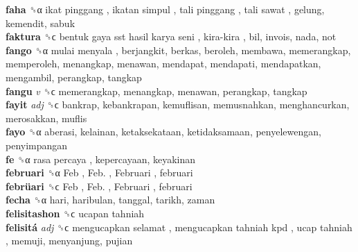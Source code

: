 \textbf{faha} ␝α   ikat pinggang ,  ikatan simpul ,  tali pinggang ,  tali sawat , gelung, kemendit, sabuk  \\
\textbf{faktura} ␝ϲ   bentuk gaya sst hasil karya seni ,  kira-kira , bil, invois, nada, not  \\
\textbf{fango} ␝α   mulai menyala , berjangkit, berkas, beroleh, membawa, memerangkap, memperoleh, menangkap, menawan, mendapat, mendapati, mendapatkan, mengambil, perangkap, tangkap  \\
\textbf{fangu} \emph{v}  ␝ϲ  memerangkap, menangkap, menawan, perangkap, tangkap  \\
\textbf{fayit} \emph{adj}  ␝ϲ  bankrap, kebankrapan, kemuflisan, memusnahkan, menghancurkan, merosakkan, muflis  \\
\textbf{fayo} ␝α  aberasi, kelainan, ketaksekataan, ketidaksamaan, penyelewengan, penyimpangan  \\
\textbf{fe} ␝α   rasa percaya , kepercayaan, keyakinan  \\
\textbf{februari} ␝α   Feb ,  Feb. ,  Februari , februari  \\
\textbf{febrüari} ␝ϲ   Feb ,  Feb. ,  Februari , februari  \\
\textbf{fecha} ␝α  hari, haribulan, tanggal, tarikh, zaman  \\
\textbf{felisitashon} ␝ϲ   ucapan tahniah   \\
\textbf{felisitá} \emph{adj}  ␝ϲ   mengucapkan selamat ,  mengucapkan tahniah kpd ,  ucap tahniah , memuji, menyanjung, pujian  \\
